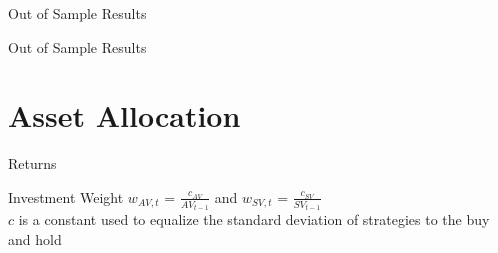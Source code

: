 \documentclass{beamer}
\begin{document}
\begin{frame}{Out of Sample Results}
	\vspace{-12pt}
	\begin{table}
		\caption{Sample 1970:07 to 2016:12}
		\vspace{-6pt}
		\begin{adjustbox}{center,max height=\totalheight}
			
		\end{adjustbox}
	\end{table}
\end{frame}

\begin{frame}{Out of Sample Results}
	\vspace{-12pt}
	\begin{table}
		\caption{Sample 1939:12 to 2016:12}
		\vspace{-6pt}
		\begin{adjustbox}{center,max height=\totalheight}
			
		\end{adjustbox}
	\end{table}
\end{frame}

\section{Asset Allocation}

\begin{frame}{Returns}
	\begin{adjustbox}{width=\textwidth,height=.8\textheight}
		
	\end{adjustbox}
\end{frame}

\begin{frame}{Investment Weight}
	$w_{AV,t}$ = $\frac{c_{AV}}{AV_{t-1}}$ and $w_{SV,t}$ = $\frac{c_{SV}}{SV_{t-1}}$\\
	$c$ is a constant used to equalize the standard deviation of strategies to the buy and hold
	\begin{adjustbox}{width=\textwidth}
		
	\end{adjustbox}
\end{frame}
\end{document}
